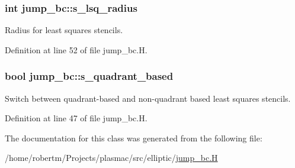 \subsubsection[{\texorpdfstring{s\+\_\+lsq\+\_\+radius}{s_lsq_radius}}]{\setlength{\rightskip}{0pt plus 5cm}int jump\+\_\+bc\+::s\+\_\+lsq\+\_\+radius\hspace{0.3cm}{\ttfamily [static]}}\hypertarget{classjump__bc_ae95628e78361c7ca66b84f9c32a6c32c}{}\label{classjump__bc_ae95628e78361c7ca66b84f9c32a6c32c}


Radius for least squares stencils. 



Definition at line 52 of file jump\+\_\+bc.\+H.

\subsubsection[{\texorpdfstring{s\+\_\+quadrant\+\_\+based}{s_quadrant_based}}]{\setlength{\rightskip}{0pt plus 5cm}bool jump\+\_\+bc\+::s\+\_\+quadrant\+\_\+based\hspace{0.3cm}{\ttfamily [static]}}\hypertarget{classjump__bc_a2a3b7c5feea33c032090f89dcfee2b16}{}\label{classjump__bc_a2a3b7c5feea33c032090f89dcfee2b16}


Switch between quadrant-\/based and non-\/quadrant based least squares stencils. 



Definition at line 47 of file jump\+\_\+bc.\+H.



The documentation for this class was generated from the following file\+:\begin{DoxyCompactItemize}
\item 
/home/robertm/\+Projects/plasmac/src/elliptic/\hyperlink{jump__bc_8H}{jump\+\_\+bc.\+H}\end{DoxyCompactItemize}
